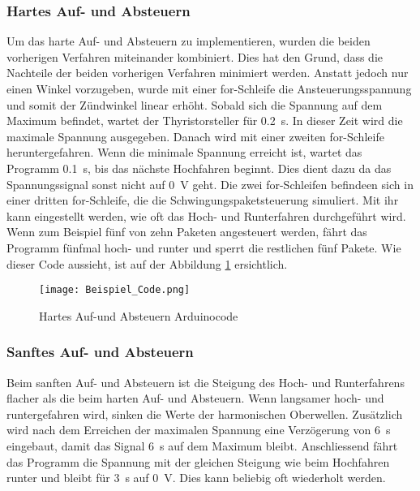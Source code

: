 \subsubsection*{Hartes Auf- und Absteuern}
Um das harte Auf- und Absteuern zu implementieren, wurden die beiden vorherigen Verfahren miteinander kombiniert. Dies hat den Grund, dass die Nachteile der beiden vorherigen Verfahren minimiert werden. Anstatt jedoch nur einen Winkel vorzugeben, wurde mit einer for-Schleife die Ansteuerungsspannung und somit der Zündwinkel linear erhöht. Sobald sich die Spannung auf dem Maximum befindet, wartet der Thyristorsteller für \SI{0.2}{s}. In dieser Zeit wird die maximale Spannung ausgegeben. Danach wird mit einer zweiten for-Schleife heruntergefahren. Wenn die minimale Spannung erreicht ist, wartet das Programm \SI{0.1}{s}, bis das nächste Hochfahren beginnt. Dies dient dazu da das Spannungssignal sonst nicht auf \SI{0}{V} geht. Die zwei for-Schleifen befindeen sich in einer dritten for-Schleife, die die Schwingungspaketsteuerung simuliert. Mit ihr kann eingestellt werden, wie oft das Hoch- und Runterfahren durchgeführt wird. Wenn zum Beispiel fünf von zehn Paketen angesteuert werden, fährt das Programm fünfmal hoch- und runter und sperrt die restlichen fünf Pakete. Wie dieser Code aussieht, ist auf der Abbildung \ref{fig:Beispielcode} ersichtlich.
\begin{figure}[ht!]
	\centering
	\texttt{[image: Beispiel\_Code.png]}	
	\caption{Hartes Auf-und Absteuern Arduinocode}\label{fig:Beispielcode}
\end{figure}

\subsubsection*{Sanftes Auf- und Absteuern}
Beim sanften Auf- und Absteuern ist die Steigung des Hoch- und Runterfahrens flacher als die beim harten Auf- und Absteuern. Wenn langsamer hoch- und runtergefahren wird, sinken die Werte der harmonischen Oberwellen. Zusätzlich wird nach dem Erreichen der maximalen Spannung eine Verzögerung von \SI{6}{s} eingebaut, damit das Signal \SI{6}{s} auf dem Maximum bleibt. Anschliessend fährt das Programm die Spannung mit der gleichen Steigung wie beim Hochfahren runter und bleibt für \SI{3}{s} auf \SI{0}{V}. Dies kann beliebig oft wiederholt werden.


